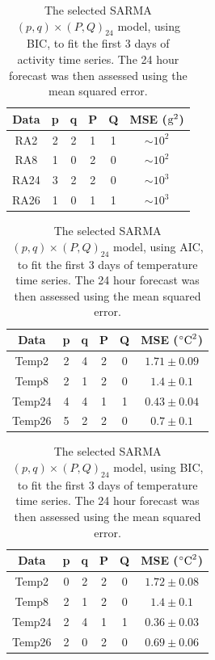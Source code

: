 \documentclass[a4paper]{proc}
\begin{document}
\begin{table}[p]
\begin{center}
\begin{tabular}{ cccccc } 
 Data & p & q & P & Q & MSE ($\textup{g}^2$)\\
  \hline
 RA2 & 2 & 2 & 1 & 1 & $\sim10^2$\\
 RA8 & 1 & 0 & 2 & 0 & $\sim10^2$\\
 RA24& 3 & 2 & 2 & 0 & $\sim10^3$\\
 RA26& 1 & 0 & 1 & 1 & $\sim10^3$\\
\end{tabular}
\end{center}
\caption{The selected SARMA$(p,q)\times(P,Q)_{24}$ model, using BIC, to fit the first 3 days of activity time series. The 24 hour forecast was then assessed using the mean squared error.}
\label{table:ra_BIC}
\end{table}

\begin{table}[p]
\begin{center}
\begin{tabular}{ cccccc } 
 Data & p & q & P & Q & MSE ($^{\circ}\textup{C}^2$)\\
  \hline
 Temp2 & 2 & 4 & 2 & 0 & $1.71\pm0.09$\\
 Temp8 & 2 & 1 & 2 & 0 & $1.4\pm0.1$\\
 Temp24& 4 & 4 & 1 & 1 & $0.43\pm0.04$\\
 Temp26& 5 & 2 & 2 & 0 & $0.7\pm0.1$\\
\end{tabular}
\end{center}
\caption{The selected SARMA$(p,q)\times(P,Q)_{24}$ model, using AIC, to fit the first 3 days of temperature time series. The 24 hour forecast was then assessed using the mean squared error.}
\label{table:temp_AIC}
\end{table}

\begin{table}[p]
\begin{center}
\begin{tabular}{ cccccc } 
 Data & p & q & P & Q & MSE ($^{\circ}\textup{C}^2$)\\
  \hline
 Temp2 & 0 & 2 & 2 & 0 & $1.72\pm0.08$\\
 Temp8 & 2 & 1 & 2 & 0 & $1.4\pm0.1$\\
 Temp24& 2 & 4 & 1 & 1 & $0.36\pm0.03$\\
 Temp26& 2 & 0 & 2 & 0 & $0.69\pm0.06$\\
\end{tabular}
\end{center}
\caption{The selected SARMA$(p,q)\times(P,Q)_{24}$ model, using BIC, to fit the first 3 days of temperature time series. The 24 hour forecast was then assessed using the mean squared error.}
\label{table:temp_BIC}
\end{table}
\end{document}
